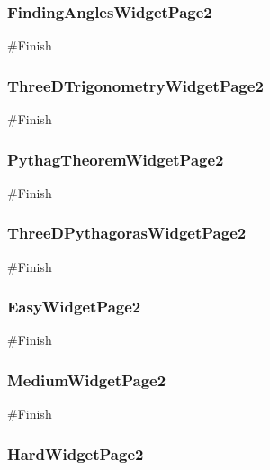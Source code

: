 \begin{landscape}
\subsubsection{FindingAnglesWidgetPage2}

\begin{python}
#Finish
\end{python}

\subsubsection{ThreeDTrigonometryWidgetPage2}

\begin{python}
#Finish
\end{python}

\subsubsection{PythagTheoremWidgetPage2}

\begin{python}
#Finish
\end{python}

\subsubsection{ThreeDPythagorasWidgetPage2}

\begin{python}
#Finish
\end{python}

\subsubsection{EasyWidgetPage2}

\begin{python}
#Finish
\end{python}

\subsubsection{MediumWidgetPage2}

\begin{python}
#Finish
\end{python}

\subsubsection{HardWidgetPage2}


\end{landscape}
